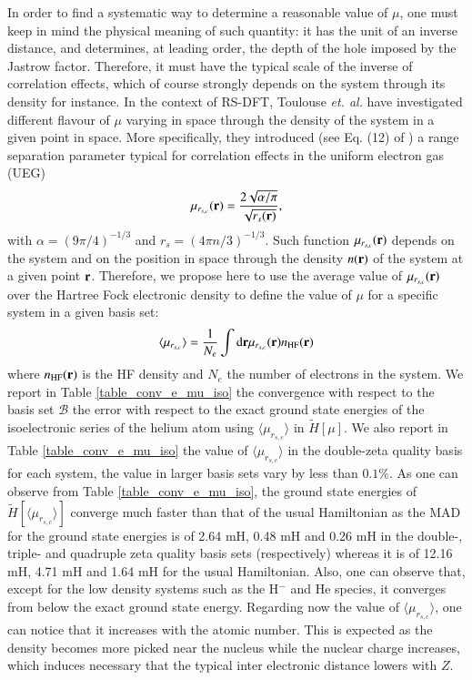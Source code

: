 \documentclass[aip,jcp,reprint,noshowkeys,superscriptaddress]{revtex4-1}
\newcommand{\basis}[0]{\mathcal{B}}
\newcommand{\mursc}{ \mu_{r_{s,c}}}
\newcommand{\murscav}{\langle \mu_{r_{s,c}}\rangle}
\begin{document}
In order to find a systematic way to determine a reasonable value of $\mu$, one must keep in mind the physical meaning of such quantity: it has the unit of an inverse distance, and determines, at leading order, the depth of the hole imposed by the Jastrow factor. 
Therefore, it must have the typical scale of the inverse of correlation effects, which of course strongly depends on the system through its density for instance. In the context of RS-DFT, Toulouse \textit{et. al.}\cite{TouColSav-JCP-05} have investigated different flavour of $\mu$ varying in space through the density of the system in a given point in space. 
More specifically, they introduced (see Eq. (12) of ) a range separation parameter typical for correlation effects in the uniform electron gas (UEG) 
\begin{equation}
 \mursc({\bf r}) =  \frac{2\sqrt{\alpha / \pi}}{\sqrt{r_s({\bf r})}},
\end{equation}
with $\alpha = (9 \pi/4)^{-1/3}$ and $r_s = (4 \pi n/3)^{-1/3}$. 
Such function $\mursc({\bf r})$ depends on the system and on the position in space through the density $n({\bf r})$ of the system at a given point ${\bf r}$. 
Therefore, we propose here to use the average value of $\mursc({\bf r})$ over the Hartree Fock electronic density to define the value of $\mu$ for a specific system in a given basis set:
\begin{equation}
 \label{eq:mu_av_rsc}
 \murscav = \frac{1}{N_e}\int \text{d}{\bf r} \mursc({\bf r}) n_{\text{HF}}({\bf r}) 
\end{equation}
where $n_{\text{HF}}({\bf r})$ is the HF density and $N_e$ the number of electrons in the system. 
We report in Table \ref{table_conv_e_mu_iso} the convergence with respect to the basis set $\basis$ the error with respect to the exact ground state energies of the isoelectronic series of the helium atom using $\murscav$ in $\tilde{H}[\mu]$. 
We also report in Table \ref{table_conv_e_mu_iso} the value of $\murscav$ in the double-zeta quality basis for each system, the value in larger basis sets vary by less than $0.1\%$. 
As one can observe from  Table \ref{table_conv_e_mu_iso}, the ground state energies of $\tilde{H}[\murscav]$ converge much faster than that of the usual Hamiltonian as the MAD for the ground state energies is of 2.64 mH, 0.48 mH and 0.26 mH in the double-, triple- and quadruple zeta quality basis sets (respectively) whereas it is of 12.16 mH, 4.71 mH and 1.64 mH for the usual Hamiltonian. Also, one can observe that, except for the low density systems such as the H${^-}$ and He species, it converges from below the exact ground state energy. Regarding now the value of $\murscav $, one can notice that it increases with the atomic number. This is expected as the density becomes more picked near the nucleus while the nuclear charge increases, which induces necessary that the typical inter electronic distance lowers with $Z$. 
\end{document}
